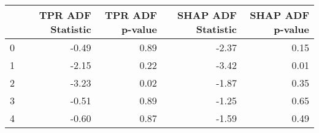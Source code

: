 \begin{tabular}{lrrrr}
\toprule
 & TPR ADF Statistic & TPR ADF p-value & SHAP ADF Statistic & SHAP ADF p-value \\
\midrule
0 & -0.49 & 0.89 & -2.37 & 0.15 \\
1 & -2.15 & 0.22 & -3.42 & 0.01 \\
2 & -3.23 & 0.02 & -1.87 & 0.35 \\
3 & -0.51 & 0.89 & -1.25 & 0.65 \\
4 & -0.60 & 0.87 & -1.59 & 0.49 \\
\bottomrule
\end{tabular}
